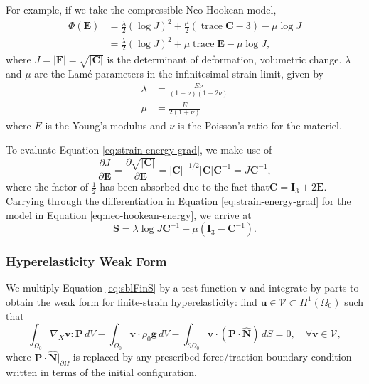 For example, if we take the compressible Neo-Hookean model,
\begin{equation}
   \begin{aligned}
   \Phi \left( \mathbf E \right) &= \frac{\lambda}{2} \left( \log J \right)^2 + \frac \mu 2 \left(\operatorname{trace} \mathbf C - 3 \right) - \mu \log J \\
     &= \frac{\lambda}{2}\left( \log J \right)^2 + \mu \operatorname{trace} \mathbf E - \mu \log J,
   \end{aligned}
   \label{eq:neo-hookean-energy}
\end{equation}
where $J = \lvert \mathbf F \rvert = \sqrt{\lvert \mathbf C \rvert}$ is the determinant of deformation, volumetric change.
$\lambda$ and $\mu$ are the Lamé parameters in the infinitesimal strain limit, given by
\begin{equation}
\begin{split}
\lambda & = \frac{E \nu}{\left( 1 + \nu \right) \left( 1 - 2 \nu \right)} \\
\mu & = \frac{E}{2 \left( 1 + \nu \right)}
\end{split}
\end{equation}
where $E$ is the Young's modulus and $\nu$ is the Poisson's ratio for the materiel.

To evaluate Equation \ref{eq:strain-energy-grad}, we make use of
\begin{equation}
   \frac{\partial J}{\partial \mathbf E} = \frac{\partial \sqrt{\lvert \mathbf C \rvert}}{\partial \mathbf E} = \lvert \mathbf C \rvert^{-1/2} \lvert \mathbf C \rvert \mathbf C^{-1} = J \mathbf C^{-1},
\end{equation}
where the factor of $\frac 1 2$ has been absorbed due to the fact that$\mathbf C = \mathbf I_3 + 2 \mathbf E$.
Carrying through the differentiation in Equation \ref{eq:strain-energy-grad} for the model in Equation \ref{eq:neo-hookean-energy}, we arrive at
\begin{equation}
   \mathbf S = \lambda \log J \mathbf C^{-1} + \mu (\mathbf I_3 - \mathbf C^{-1}).
   \label{eq:neo-hookean-stress}
\end{equation}

\subsubsection{Hyperelasticity Weak Form}

We multiply Equation \ref{eq:sblFinS} by a test function $\mathbf v$ and integrate by parts to obtain the weak form for finite-strain hyperelasticity:
find $\mathbf u \in \mathcal V \subset H^1 \left( \Omega_0 \right)$ such that
\begin{equation}
    \int_{\Omega_0}{\nabla_X \mathbf{v} \!:\! \mathbf{P}} \, dV
    - \int_{\Omega_0}{\mathbf{v} \cdot \rho_0 \mathbf{g}} \, dV
    - \int_{\partial \Omega_0}{\mathbf{v} \cdot (\mathbf{P} \cdot \hat{\mathbf{N}})} \, dS
    = 0, \quad \forall \mathbf v \in \mathcal V,
   \label{eq:hyperelastic-weak-form-initial}
\end{equation}    
where $\mathbf{P} \cdot \hat{\mathbf{N}}|_{\partial\Omega}$ is replaced by any prescribed force/traction boundary condition written in terms of the initial configuration.

